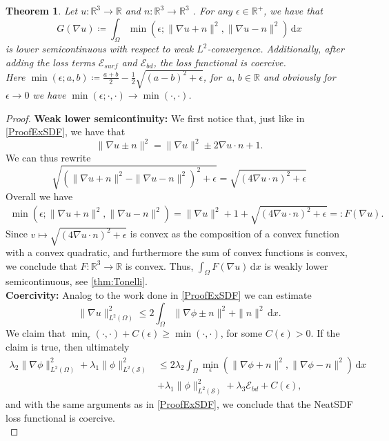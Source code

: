 \documentclass[12pt,openany]{book}
\newcommand{\R}{\mathbb{R}}
\def\S{\mathcal{S}}
\theoremstyle{plainnormal}
\newtheorem{theorem}{Theorem}[section]
\theoremstyle{remark}
\begin{document}
\begin{theorem}\label{min_lsc}
    Let $u:\R^3\rightarrow\R$ and $n: \R^3\rightarrow\R^3$ . For any $\epsilon \in \R^+$, we have that $$G(\nabla u) \coloneqq \int_\Omega \min (\epsilon; \|\nabla u+ n\|^2,\|\nabla u - n\|^2)\,\mathrm{d}x$$ is lower semicontinuous with respect to weak $L^2$-convergence. Additionally, after adding the loss terms $\mathcal{E}_{surf}$ and $\mathcal{E}_{bd}$, the loss functional is coercive.\\
    Here $\min(\epsilon;a,b) \coloneqq \frac{a + b}{2} - \frac{1}{2}\sqrt{(a-b)^2 + \epsilon}$, for $\,a,\,b \in \R$ and obviously for $\epsilon  \rightarrow 0$ we have $\min(\epsilon; \cdot, \cdot) \rightarrow \min(\cdot, \cdot)$. 
\end{theorem}
\begin{proof}
\textbf{Weak lower semicontinuity:} We first notice that, just like in \cref{ProofExSDF}, we have that $$\|\nabla u \pm n\|^2 = \|\nabla u\|^2 \pm 2 \nabla u \cdot n + 1.$$
    We can thus rewrite $$\sqrt{(\|\nabla u + n\|^2 - \|\nabla u - n\|^2)^2 + \epsilon} = \sqrt{(4 \nabla u\cdot n)^2 + \epsilon}$$
    Overall we have \begin{align*}
        \min (\epsilon; \|\nabla u+ n\|^2,\|\nabla u - n\|^2) = \|\nabla u\|^2 + 1 + \sqrt{(4 \nabla u\cdot n)^2 + \epsilon}=: F(\nabla u). 
    \end{align*}
    Since $v\mapsto\sqrt{(4 \nabla u\cdot n)^2 + \epsilon}$ is convex as the composition of a convex function with a convex quadratic, and furthermore the sum of convex functions is convex, we conclude  that $F :\R^3 \rightarrow\R$ is convex. Thus, $\int_\Omega F(\nabla u)\, \mathrm{d}x$ is weakly lower semicontinuous, see \cref{thm:Tonelli}.\\
    \textbf{Coercivity:} Analog to the work done in \cref{ProofExSDF} we can estimate $$\|\nabla u\|^2_{L^2(\Omega)} \leq 2 \int_\Omega \|\nabla \phi \pm n\|^2 + \|n\|^2\,\mathrm{d}x.$$
    We claim that $\min_\epsilon(\cdot, \cdot) + C(\epsilon) \geq \min(\cdot, \cdot)$, for some $C(\epsilon) > 0$. If the claim is true, then ultimately 
    \begin{align*}
    \lambda_2\|\nabla \phi\| ^2_{L^2(\Omega)} + \lambda_1 \|\phi\| ^2_{L^2(\S)}
 &\leq 2 \lambda_2\int_\Omega\min_\epsilon(\|\nabla \phi + n\|^2, \|\nabla \phi - n\|^2) \,\mathrm{d}x \\ 
 &+ \lambda_1 \|\phi\| ^2_{L^2(\S)} + \lambda_3 \mathcal{E}_{bd} + C(\epsilon),
\end{align*} 
and with the same arguments as in \cref{ProofExSDF}, we conclude that the NeatSDF loss functional is coercive.\\

\end{proof}
\end{document}

